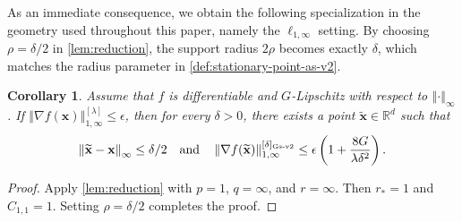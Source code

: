 \documentclass{article}
\newtheorem{cor}[thm]{Corollary}
\def \x {\mathbf{x}}
\def \R {\mathbb{R}}
\def \xt {\widetilde{\x}}
\newcommand{\norm}[1]{\left\Vert#1\right\Vert}
\newcommand{\brac}[1]{\left(#1\right)}
\begin{document}
As an immediate consequence, we obtain the following specialization in the geometry used throughout this paper, namely the $\ell_{1,\infty}$ setting. By choosing $\rho=\delta/2$ in \cref{lem:reduction}, the support radius $2\rho$ becomes exactly $\delta$, which matches the radius parameter in \cref{def:stationary-point-as-v2}.

\begin{cor}\label{cor:reduction-l1-linf-delta}
Assume that $f$ is differentiable and $G$-Lipschitz with respect to $\norm{\cdot}_\infty$. If $\norm{\nabla f(\x)}_{1,\infty}^{[\lambda]}\le\epsilon$, then for every $\delta>0$, there exists a point $\xt\in\R^d$ such that
\begin{align*}
    \norm{\xt-\x}_\infty\le \delta/2
    \quad\text{and}\quad
    \norm{\nabla f(\xt)}_{1,\infty}^{[\delta]_{\textnormal{Gs-v2}}}
    \le
    \epsilon\brac{1+\frac{8G}{\lambda\delta^2}}.
\end{align*}
\end{cor}

\begin{proof}
Apply \cref{lem:reduction} with $p=1$, $q=\infty$, and $r=\infty$. Then $r_*=1$ and $C_{1,1}=1$. Setting $\rho=\delta/2$ completes the proof.
\end{proof}
\end{document}
